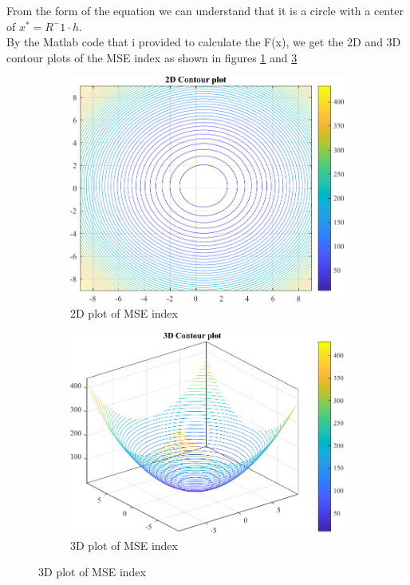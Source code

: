 From the form of the equation we can understand that it is a circle with a center of $x^* = R^-1 \cdot h.$\\
By the Matlab code that i provided to calculate the F(x), we get the 2D and 3D contour plots of the MSE index as shown in figures \ref{fig:prob_9_2d} and \ref{fig:prob_9_3d}\\
\begin{figure}[H]
	\centering
	\begin{subfigure}{0.47\textwidth}
		\centering
		\includegraphics[width=\textwidth]{../Problem 9/contour_2d.pdf}
		\caption{2D plot of MSE index}
		\label{fig:prob_9_2d}
	\end{subfigure}
	\hspace{2mm}
	\begin{subfigure}{0.47\textwidth}
		\centering
		\includegraphics[width=\textwidth]{../Problem 9/contour_3d.pdf}
		\caption{3D plot of MSE index}
		\label{fig:prob_9_3d}
	\end{subfigure}	
\end{figure}

